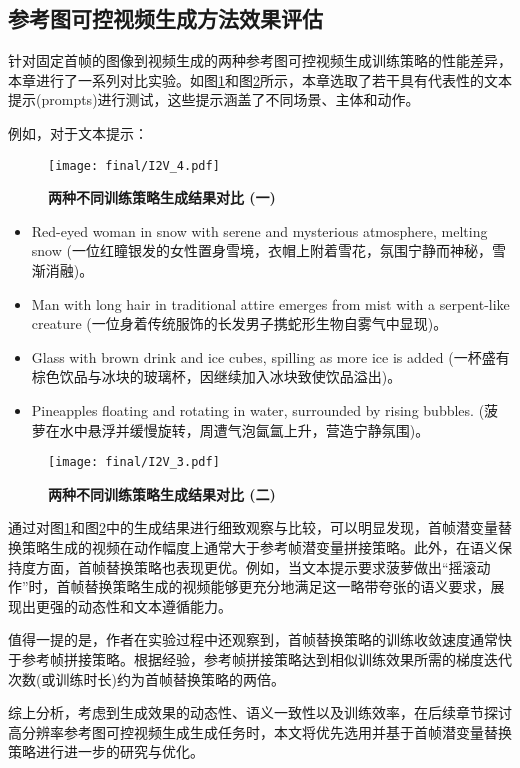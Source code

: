 \subsection{参考图可控视频生成方法效果评估}
针对固定首帧的图像到视频生成的两种参考图可控视频生成训练策略的性能差异，本章进行了一系列对比实验。如图\ref{I2V_4}和图\ref{I2V_3}所示，本章选取了若干具有代表性的文本提示(prompts)进行测试，这些提示涵盖了不同场景、主体和动作。

例如，对于文本提示：
\begin{figure}[htbp]
    \centering
    \texttt{[image: final/I2V\_4.pdf]}
    \caption{\textbf{两种不同训练策略生成结果对比 (一)}}
    \label{I2V_4}
    \end{figure}
\begin{itemize}
\item Red-eyed woman in snow with serene and mysterious atmosphere, melting snow (一位红瞳银发的女性置身雪境，衣帽上附着雪花，氛围宁静而神秘，雪渐消融)。
\item Man with long hair in traditional attire emerges from mist with a serpent-like creature (一位身着传统服饰的长发男子携蛇形生物自雾气中显现)。
\item Glass with brown drink and ice cubes, spilling as more ice is added (一杯盛有棕色饮品与冰块的玻璃杯，因继续加入冰块致使饮品溢出)。
\item Pineapples floating and rotating in water, surrounded by rising bubbles. (菠萝在水中悬浮并缓慢旋转，周遭气泡氤氲上升，营造宁静氛围)。
\end{itemize}


\begin{figure}[htbp]
    \centering
    \texttt{[image: final/I2V\_3.pdf]}
    \caption{\textbf{两种不同训练策略生成结果对比 (二)}}
    \label{I2V_3}
\end{figure}

通过对图\ref{I2V_4}和图\ref{I2V_3}中的生成结果进行细致观察与比较，可以明显发现，首帧潜变量替换策略生成的视频在动作幅度上通常大于参考帧潜变量拼接策略。此外，在语义保持度方面，首帧替换策略也表现更优。例如，当文本提示要求菠萝做出“摇滚动作”时，首帧替换策略生成的视频能够更充分地满足这一略带夸张的语义要求，展现出更强的动态性和文本遵循能力。

值得一提的是，作者在实验过程中还观察到，首帧替换策略的训练收敛速度通常快于参考帧拼接策略。根据经验，参考帧拼接策略达到相似训练效果所需的梯度迭代次数(或训练时长)约为首帧替换策略的两倍。

综上分析，考虑到生成效果的动态性、语义一致性以及训练效率，在后续章节探讨高分辨率参考图可控视频生成生成任务时，本文将优先选用并基于首帧潜变量替换策略进行进一步的研究与优化。

